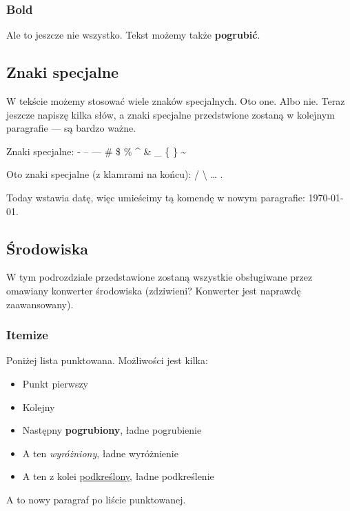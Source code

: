\documentclass[10pt,a4paper]{article}
\begin{document}
\subsubsection{Bold}
Ale to jeszcze nie wszystko. Tekst możemy także \textbf{pogrubić}.
 
\subsection{Znaki specjalne}
W tekście możemy stosować wiele znaków specjalnych. Oto one. Albo nie. Teraz jeszcze napiszę kilka słów, a znaki specjalne przedstwione zostaną w kolejnym paragrafie --- są bardzo ważne.\par
Znaki specjalne: - -- --- \# \$ \% \^{} \& \_ \{ \} \~{} \par
Oto znaki specjalne (z klamrami na końcu): \slash{} \textbackslash{} \ldots{} \textcelsius{} \texteuro{} \textGamma{} \textDelta{} \textTheta{} \textLambda{} \textPi{} \textSigma{} \textPhi{} \textPsi{} \textOmega{} \textalpha{} \textbeta{} \textgamma{} \textdelta{} \textepsilon{} \texteta{} \texttheta{} \textiota{} \textkappa{} \textlambda{} \textmugreek{} \textnu{} \textxi{} \textpi{} \textrho{} \textsigma{} \texttau{} \textupsilon{} \textphi{} \textchi{} \textpsi{} \textomega{}. \par
Today wstawia datę, więc umieścimy tą komendę w nowym paragrafie: \today{}.

\subsection{Środowiska}
W tym podrozdziale przedstawione zostaną wszystkie obsługiwane przez omawiany konwerter środowiska (zdziwieni? Konwerter jest naprawdę zaawansowany).

\subsubsection{Itemize}
Poniżej lista punktowana. Możliwości jest kilka:
\begin{itemize}
\item Punkt pierwszy
\item Kolejny
\item Następny \textbf{pogrubiony}, ładne pogrubienie
\item A ten \emph{wyróżniony},  ładne wyróżnienie
\item A ten z kolei \underline{podkreślony}, ładne podkreślenie
\end{itemize}
A to nowy paragraf po liście punktowanej.
\end{document}
